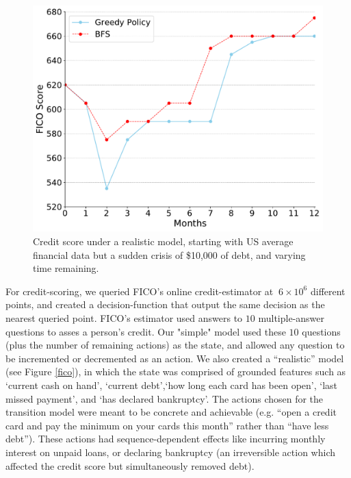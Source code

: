 \begin{figure}
    \label{fig:averageamerican}
\endminipage\hfill
{}
\includegraphics[width=\linewidth]{figures/bankrupt-rand.pdf}
\caption{Credit score under a realistic model, starting with US average financial data but a sudden crisis of \$10,000 of debt, and varying time remaining.}
    \label{fig:bankruptcy}
\endminipage\hfill
\end{figure}


For credit-scoring, we queried FICO's online credit-estimator \cite{myfico} at $~6\times10^6$ different points, and created a decision-function that output the same decision as the nearest queried point. FICO's estimator used answers to $10$ multiple-answer questions to asses a person's credit. Our "simple" model used these $10$ questions (plus the number of remaining actions) as the state, and allowed any question to be incremented or decremented as an action. We also created a ``realistic'' model (see Figure \ref{fico}), in which the state was comprised of grounded features such as `current cash on hand', `current debt',`how long each card has been open', `last missed payment', and `has declared bankruptcy'. The actions chosen for the transition model were meant to be concrete and achievable (e.g. ``open a credit card and pay the minimum on your cards this month'' rather than ``have less debt''). These actions had sequence-dependent effects like incurring monthly interest on unpaid loans, or declaring bankruptcy (an irreversible action which affected the credit score but simultaneously removed debt).

